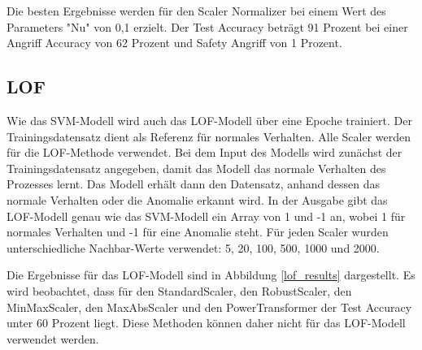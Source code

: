 \documentclass[12pt,a4paper]{scrartcl}
\numberwithin{equation}{section}
\begin{document}
Die besten Ergebnisse werden für den Scaler Normalizer bei einem Wert des Parameters "Nu" von 0,1 erzielt. Der Test Accuracy beträgt 91 Prozent bei einer Angriff Accuracy von 62 Prozent und Safety Angriff von 1 Prozent. 

\subsection{LOF}

Wie das SVM-Modell wird auch das LOF-Modell über eine Epoche trainiert. Der Trainingsdatensatz dient als Referenz für normales Verhalten. Alle Scaler werden für die LOF-Methode verwendet. Bei dem Input des Modells wird zunächst der Trainingsdatensatz angegeben, damit das Modell das normale Verhalten des Prozesses lernt. Das Modell erhält dann den Datensatz, anhand dessen das normale Verhalten oder die Anomalie erkannt wird. In der Ausgabe gibt das LOF-Modell genau wie das SVM-Modell ein Array von 1 und -1 an, wobei 1 für normales Verhalten und -1 für eine Anomalie steht. Für jeden Scaler wurden unterschiedliche Nachbar-Werte verwendet: 5, 20, 100, 500, 1000 und 2000.

Die Ergebnisse für das LOF-Modell sind in Abbildung \ref{lof_results} dargestellt. Es wird beobachtet, dass für den StandardScaler, den RobustScaler, den MinMaxScaler, den MaxAbsScaler und den PowerTransformer der Test Accuracy unter 60 Prozent liegt. Diese Methoden können daher nicht für das LOF-Modell verwendet werden.
\end{document}
